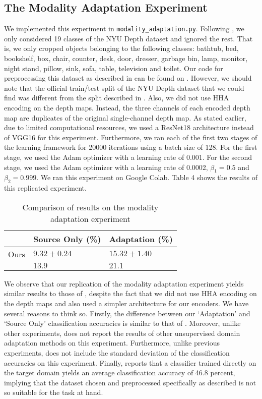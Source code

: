 \documentclass[14pt]{extarticle}
\begin{document}
		\subsection{The Modality Adaptation Experiment}
		We implemented this experiment in \texttt{modality\_adaptation.py}. Following \cite{adda}, we only considered 19 classes of the NYU Depth dataset and ignored the rest. That is, we only cropped objects belonging to the following classes: bathtub, bed, bookshelf, box, chair, counter, desk, door, dresser, garbage bin, lamp, monitor, night stand, pillow, sink, sofa, table, television and toilet. Our code for preprocessing this dataset as described in \cite{adda} can be found on \cite{nyud2jpg}. However, we should note that the official train/test split of the NYU Depth dataset that we could find \cite{nyud2split} was different from the split described in \cite{adda}. Also, we did not use HHA encoding on the depth maps. Instead, the three channels of each encoded depth map are duplicates of the original single-channel depth map. As stated earlier, due to limited computational resources, we used a ResNet18 architecture instead of VGG16 for this experiment. Furthermore, we ran each of the first two stages of the learning framework for 20000 iterations using a batch size of 128. For the first stage, we used the Adam optimizer with a learning rate of 0.001. For the second stage, we used the Adam optimizer with a learning rate of 0.0002, $\beta_1 = 0.5$ and $\beta_2 = 0.999$. We ran this experiment on Google Colab. Table 4 shows the results of this replicated experiment.
		\begin{table}[H]
			\centering
			\begin{tabular}{|P{40mm}|P{40mm}|P{40mm}|}
				\hline
				 & Source Only (\%) & Adaptation (\%)\\
				\hline
				Ours & $9.32 \pm 0.24$ & $15.32 \pm 1.40$\\
				\hline
				\cite{adda} & $13.9$ & $21.1$\\
				\hline
			\end{tabular}
			\caption{Comparison of results on the modality adaptation experiment}
		\end{table}
		We observe that our replication of the modality adaptation experiment yields similar results to those of \cite{adda}, despite the fact that we did not use HHA encoding on the depth maps and also used a simpler architecture for our encoders. We have several reasons to think so. Firstly, the difference between our `Adaptation' and `Source Only' classification accuracies is similar to that of \cite{adda}. Moreover, unlike other experiments, \cite{adda} does not report the results of other unsupervised domain adaptation methods on this experiment. Furthermore, unlike previous experiments, \cite{adda} does not include the standard deviation of the classification accuracies on this experiment. Finally, \cite{adda} reports that a classifier trained directly on the target domain yields an average classification accuracy of 46.8 percent, implying that the dataset chosen and preprocessed specifically as described is not so suitable for the task at hand.
\end{document}
